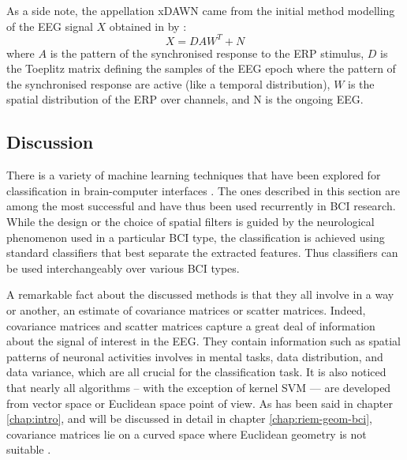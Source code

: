 As a side note, the appellation xDAWN came from the initial method modelling of the EEG signal $X$ obtained in by \cite{rivet_xdawn_2009}:
\begin{equation}
\label{eq:xdawn-initial}
X = D A W^T+N
\end{equation}
where $A$ is the pattern of the synchronised response to the ERP stimulus, $D$ is the Toeplitz matrix defining the samples of the EEG epoch where the pattern of the synchronised response are active (like a temporal distribution), $W$ is the spatial distribution of the ERP over channels, and N is the ongoing EEG.    


\subsection{Discussion}

There is a variety of machine learning techniques that have been explored for classification in brain-computer interfaces \citep{lotte_review_2007, nicolas-alonso_brain_2012, bashashati_survey_2007, khorshidtalab_eeg_2011, krusienski_critical_2011}.  
The ones described in this section are among the most successful and have thus been used recurrently in BCI research.
While the design or the choice of spatial filters is guided by the neurological phenomenon used in a particular BCI type, the classification is achieved using standard classifiers that best separate the extracted features. 
Thus classifiers can be used interchangeably over various BCI types.  

A remarkable fact about the discussed methods is that they all involve in a way or another, an estimate of covariance matrices or scatter matrices.
Indeed, covariance matrices and scatter matrices capture a great deal of information about the signal of interest in the EEG. 
They contain information such as spatial patterns of neuronal activities involves in mental tasks, data distribution, and data variance, which are all crucial for the classification task.
It is also noticed that nearly all algorithms -- with the exception of kernel SVM — are developed from vector space or Euclidean space point of view. 
As has been said in chapter \ref{chap:intro}, and will be discussed in detail in chapter \ref{chap:riem-geom-bci}, covariance matrices lie on a curved space where Euclidean geometry is not suitable \citep{congedo_new_2013}.

